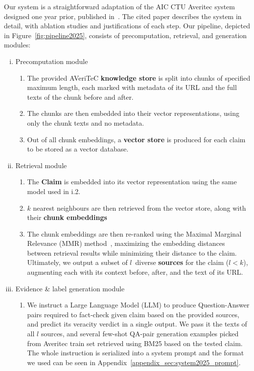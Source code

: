 Our system is a straightforward adaptation of the AIC CTU Averitec system designed one year prior, published in~\cite{ullrich-etal-2024-aic}.
The cited paper describes the system in detail, with ablation studies and justifications of each step.
Our pipeline, depicted in Figure~\ref{fig:pipeline2025}, consists of precomputation, retrieval, and generation modules:

\begin{enumerate}[i.]  %
    \item Precomputation module
    \begin{enumerate}[1.]  %
        \item The provided AVeriTeC \textbf{knowledge store} \cite{averitec2024} is split into chunks of specified maximum length, each marked with metadata of its URL and the full texts of the chunk before and after.
        \item The chunks are then embedded into their vector representations, using only the chunk texts and no metadata.
        \item Out of all chunk embeddings, a \textbf{vector store} is produced for each claim to be stored as a vector database.
    \end{enumerate}
    \item Retrieval module
    \begin{enumerate}[1.]   %
        \item The \textbf{Claim} is embedded into its vector representation using the same model used in i.2.
        \item $k$ nearest neighbours are then retrieved from the vector store, along with their \textbf{chunk embeddings}
        \item The chunk embeddings are then re-ranked using the Maximal Marginal Relevance (MMR) method~\cite{carbonell-mmr}, maximizing the embedding distances between retrieval results while minimizing their distance to the claim.
        Ultimately, we output a subset of $l$~diverse \textbf{sources} for the claim ($l<k$), augmenting each with its context before, after, and the text of its URL.
    \end{enumerate}
    \item Evidence \& label generation module
    \begin{enumerate}[1.]   %
        \item We instruct a Large Language Model (LLM) to produce Question-Answer pairs required to fact-check given claim based on the provided sources, and predict its veracity verdict in a single output. We pass it the texts of all $l$ sources, and several few-shot QA-pair generation examples picked from Averitec train set retrieved using BM25 based on the tested claim. The whole instruction is serialized into a system prompt and the format we used can be seen in Appendix~\ref{appendix_sec:system2025_prompt}.

\end{enumerate}
\end{enumerate}
